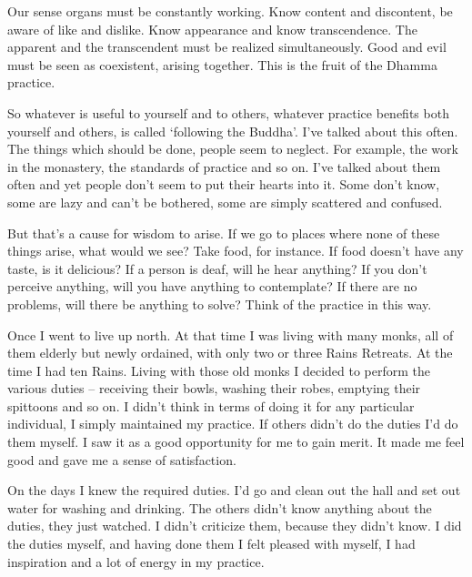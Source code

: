 Our sense organs must be constantly working. Know content and discontent, be aware of like and dislike. Know appearance and know transcendence. The apparent and the transcendent must be realized simultaneously. Good and evil must be seen as coexistent, arising together. This is the fruit of the Dhamma practice. 

So whatever is useful to yourself and to others, whatever practice benefits both yourself and others, is called `following the Buddha'. I've talked about this often. The things which should be done, people seem to neglect. For example, the work in the monastery, the standards of practice and so on. I've talked about them often and yet people don't seem to put their hearts into it. Some don't know, some are lazy and can't be bothered, some are simply scattered and confused. 

But that's a cause for wisdom to arise. If we go to places where none of these things arise, what would we see? Take food, for instance. If food doesn't have any taste, is it delicious? If a person is deaf, will he hear anything? If you don't perceive anything, will you have anything to contemplate? If there are no problems, will there be anything to solve? Think of the practice in this way. 

Once I went to live up north. At that time I was living with many monks, all of them elderly but newly ordained, with only two or three Rains Retreats. At the time I had ten Rains. Living with those old monks I decided to perform the various duties -- receiving their bowls, washing their robes, emptying their spittoons and so on. I didn't think in terms of doing it for any particular individual, I simply maintained my practice. If others didn't do the duties I'd do them myself. I saw it as a good opportunity for me to gain merit. It made me feel good and gave me a sense of satisfaction. 

On the  days I knew the required duties. I'd go and clean out the  hall and set out water for washing and drinking. The others didn't know anything about the duties, they just watched. I didn't criticize them, because they didn't know. I did the duties myself, and having done them I felt pleased with myself, I had inspiration and a lot of energy in my practice. 

